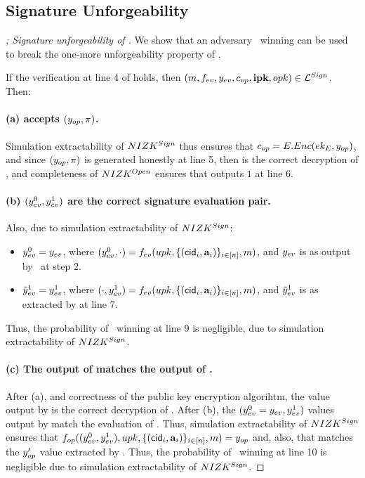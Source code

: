 \subsection{Signature Unforgeability}

\begin{proof}[; Signature unforgeability of \CUASGen]
  We show that an adversary \adv~winning \ExpForgeSign can be used to break the
  one-more unforgeability property of \SBCM.
 
  If the verification at line 4 of \ExpForgeSign holds, then $(m,f_{ev},
  y_{ev},c_{op},\mathbf{ipk},opk) \in \mathcal{L}^{Sign}$. Then:

  \paragraph{(a) \Judge accepts $(y_{op},\pi)$.} %
  Simulation extractability of $NIZK^{Sign}$ thus ensures that $c_{op} =
  E.Enc(ek_{E},y_{op})$, and since $(y_{op},\pi)$ is generated honestly at
  line 5, then \yinsp is the correct decryption of \cinsp, and completeness of
  $NIZK^{Open}$ ensures that \Judge outputs $1$ at line 6.

  \paragraph{(b) $(y_{ev}^0,y_{ev}^1)$ are the correct signature evaluation
    pair.} Also, due to simulation extractability of $NIZK^{Sign}$:

  \begin{itemize}
  \item $y_{ev}^0 = y_{ev}$, where $(y_{ev}^0,\cdot) = f_{ev}(upk,\lbrace
    (\mathsf{cid}_i,\mathbf{a}_i) \rbrace_{i\in[n]},m)$, and $y_{ev}$ is as output by
    \adv~at step 2.    
  \item $\tilde{y}_{ev}^1 = y_{ev}^1$, where $(\cdot,y_{ev}^1) = f_{ev}(upk,\lbrace
    (\mathsf{cid}_i,\mathbf{a}_i)\rbrace_{i\in[n]},m)$, and $\tilde{y}_{ev}^1$ is as extracted
    by \ExtractSign at line 7.
  \end{itemize}

  Thus, the probability of \adv~winning at line 9 is negligible, due to
  simulation extractability of $NIZK^{Sign}$.

  \paragraph{(c) The output of \finsp matches the output of \Open.} %
  After (a), and correctness of the public key encryption algorihtm, the \yinsp
  value output by \Open is the correct decryption of
  \cinsp. After (b), the $(y_{ev}^0=y_{ev},y_{ev}^1)$ values output by
  \ExtractSign match the evaluation of \feval. Thus, simulation extractability
  of $NIZK^{Sign}$ ensures that $f_{op}((y_{ev}^0,y_{ev}^1),upk,\lbrace
  (\mathsf{cid}_i,\mathbf{a}_i)\rbrace_{i\in[n]},m) = y_{op}$ and, also, that \yinsp
  matches the $y_{op}'$ value extracted by \ExtractSign. Thus, the probability
  of \adv~winning at line 10 is negligible due to simulation extractability
  of $NIZK^{Sign}$.


\end{proof}
